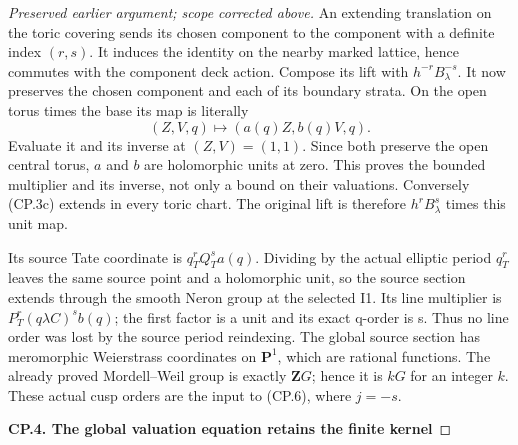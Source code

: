 \begin{proof}[Preserved earlier argument; scope corrected above]
An extending translation on the toric covering sends its chosen
component to the component with a definite index \((r,s)\).
It induces the identity on the nearby marked lattice, hence commutes
with the component deck action. Compose its lift with
\(h^{-r}B_\lambda^{-s}\). It now preserves the chosen component
and each of its boundary strata. On the open torus times the base
its map is literally
\[
                  (Z,V,q)\longmapsto(a(q)Z,b(q)V,q).
                                                               \tag{CP.3c}
\]
Evaluate it and its inverse at \((Z,V)=(1,1)\). Since both preserve
the open central torus, \(a\) and \(b\) are holomorphic units
at zero. This proves the bounded multiplier and its inverse, not
only a bound on their valuations. Conversely (CP.3c) extends in
every toric chart. The original lift is therefore
\(h^rB_\lambda^s\) times this unit map.

Its source Tate coordinate is \(q_T^r Q_T^s a(q)\). Dividing by
the actual elliptic period \(q_T^r\) leaves the same source point
and a holomorphic unit, so the source section extends through the
smooth Neron group at the selected I1. Its line multiplier is
\(P_T^r(q\lambda C)^s b(q)\); the first factor is a unit and
its exact q-order is s. Thus no line order was lost by the source
period reindexing. The global source section has meromorphic
Weierstrass coordinates on \(\mathbf P^1\), which are rational
functions. The already proved Mordell--Weil group is exactly
\(\mathbf ZG\); hence it is \(kG\) for an integer \(k\). These actual
cusp orders are the input to (CP.6), where \(j=-s\).

\par

\medskip\noindent\textbf{CP.4. The global valuation equation retains the finite kernel}

\par\nobreak


\end{proof}
